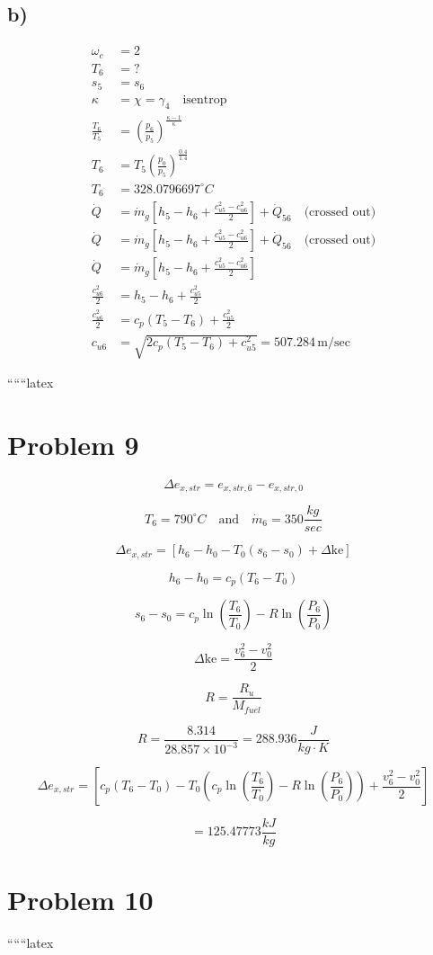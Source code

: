 

\subsection*{b)}

\begin{align*}
    \omega_c &= 2 \\
    T_6 &= ? \\
    s_5 &= s_6 \\
    \kappa &= \chi = \gamma_4 \quad \text{isentrop} \\
    \frac{T_6}{T_5} &= \left( \frac{p_6}{p_5} \right)^{\frac{\kappa - 1}{\kappa}} \\
    T_6 &= T_5 \left( \frac{p_0}{p_5} \right)^{\frac{0.4}{1.4}} \\
    T_6 &= 328.0796697^\circ C \\
    \dot{Q} &= \dot{m}_g \left[ h_5 - h_6 + \frac{c_{u5}^2 - c_{u6}^2}{2} \right] + \dot{Q}_{56} \quad \text{(crossed out)} \\
    \dot{Q} &= \dot{m}_g \left[ h_5 - h_6 + \frac{c_{u5}^2 - c_{u6}^2}{2} \right] + \dot{Q}_{56} \quad \text{(crossed out)} \\
    \dot{Q} &= \dot{m}_g \left[ h_5 - h_6 + \frac{c_{u5}^2 - c_{u6}^2}{2} \right] \\
    \frac{c_{u6}^2}{2} &= h_5 - h_6 + \frac{c_{u5}^2}{2} \\
    \frac{c_{u6}^2}{2} &= c_p (T_5 - T_6) + \frac{c_{u5}^2}{2} \\
    c_{u6} &= \sqrt{2 c_p (T_5 - T_6) + c_{u5}^2} = 507.284 \, \text{m/sec}
\end{align*}

``````latex


\section*{Problem 9}

\[
\Delta e_{x,str} = e_{x,str,6} - e_{x,str,0}
\]

\[
T_6 = 790^\circ C \quad \text{and} \quad \dot{m}_6 = 350 \frac{kg}{sec}
\]

\[
\Delta e_{x,str} = \left[ h_6 - h_0 - T_0 (s_6 - s_0) + \Delta \text{ke} \right]
\]

\[
h_6 - h_0 = c_p (T_6 - T_0)
\]

\[
s_6 - s_0 = c_p \ln \left( \frac{T_6}{T_0} \right) - R \ln \left( \frac{P_6}{P_0} \right)
\]

\[
\Delta \text{ke} = \frac{v_6^2 - v_0^2}{2}
\]

\[
R = \frac{R_u}{M_{fuel}}
\]

\[
R = \frac{8.314}{28.857 \times 10^{-3}} = 288.936 \frac{J}{kg \cdot K}
\]

\[
\Delta e_{x,str} = \left[ c_p (T_6 - T_0) - T_0 \left( c_p \ln \left( \frac{T_6}{T_0} \right) - R \ln \left( \frac{P_6}{P_0} \right) \right) + \frac{v_6^2 - v_0^2}{2} \right]
\]

\[
= \boxed{125.47773 \frac{kJ}{kg}}
\]

\section*{Problem 10}

``````latex